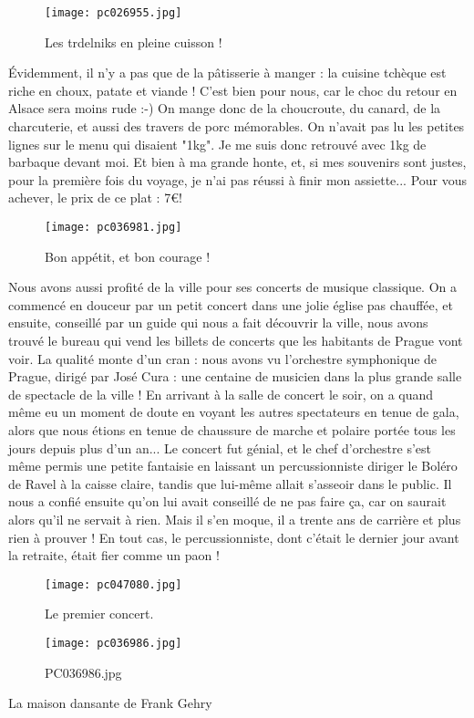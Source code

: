 \documentclass{book}
\begin{document}
\begin{figure}[h]
\centering
\texttt{[image: pc026955.jpg]}
\caption*{Les trdelniks en pleine cuisson !}
\end{figure}

Évidemment, il n'y a pas que de la pâtisserie à manger : la cuisine tchèque est riche en choux, patate et viande ! C'est bien pour nous, car le choc du retour en Alsace sera moins rude :-) On mange donc de la choucroute, du canard, de la charcuterie, et aussi des travers de porc mémorables. On n'avait pas lu les petites lignes sur le menu qui disaient "1kg". Je me suis donc retrouvé avec 1kg de barbaque devant moi. Et bien à ma grande honte, et, si mes souvenirs sont justes, pour la première fois du voyage, je n'ai pas réussi à finir mon assiette... Pour vous achever, le prix de ce plat : 7\euro !


\begin{figure}[h]
\centering
\texttt{[image: pc036981.jpg]}
\caption*{Bon appétit, et bon courage !}
\end{figure}

Nous avons aussi profité de la ville pour ses concerts de musique classique. On a commencé en douceur par un petit concert dans une jolie église pas chauffée, et ensuite, conseillé par un guide qui nous a fait découvrir la ville, nous avons trouvé le bureau qui vend les billets de concerts que les habitants de Prague vont voir. La qualité monte d'un cran : nous avons vu l'orchestre symphonique de Prague, dirigé par José Cura : une centaine de musicien dans la plus grande salle de spectacle de la ville ! En arrivant à la salle de concert le soir, on a quand même eu un moment de doute en voyant les autres spectateurs en tenue de gala, alors que nous étions en tenue de chaussure de marche et polaire portée tous les jours depuis plus d'un an... Le concert fut génial, et le chef d'orchestre s'est même permis une petite fantaisie en laissant un percussionniste diriger le Boléro de Ravel à la caisse claire, tandis que lui-même allait s'asseoir dans le public. Il nous a confié ensuite qu'on lui avait conseillé de ne pas faire ça, car on saurait alors qu'il ne servait à rien. Mais il s'en moque, il a trente ans de carrière et plus rien à prouver ! En tout cas, le percussionniste, dont c'était le dernier jour avant la retraite, était fier comme un paon !


\begin{figure}[h]
\centering
\texttt{[image: pc047080.jpg]}
\caption*{Le premier concert.}
\end{figure}
\begin{figure}[h]
\centering
\texttt{[image: pc036986.jpg]}
\caption*{PC036986.jpg}
\end{figure}La maison dansante de Frank Gehry
\end{document}

